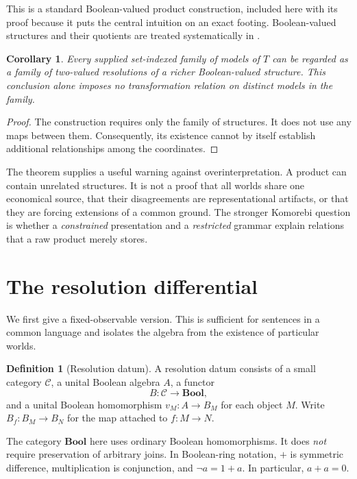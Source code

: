 \documentclass[11pt,letterpaper]{article}
\newtheorem{corollary}[theorem]{Corollary}
\theoremstyle{definition}
\newtheorem{definition}[theorem]{Definition}
\newcommand{\Bool}{\mathbf{Bool}}
\begin{document}
This is a standard Boolean-valued product construction, included here with its proof because it puts the central intuition on an exact footing. Boolean-valued structures and their quotients are treated systematically in \cite{hamkinsseabold}.

\begin{corollary}\label{cor:resolution-not-explanation}
Every supplied set-indexed family of models of $T$ can be regarded as a family of two-valued resolutions of a richer Boolean-valued structure. This conclusion alone imposes no transformation relation on distinct models in the family.
\end{corollary}
\begin{proof}
The construction requires only the family of structures. It does not use any maps between them. Consequently, its existence cannot by itself establish additional relationships among the coordinates.
\end{proof}

The theorem supplies a useful warning against overinterpretation. A product can contain unrelated structures. It is not a proof that all worlds share one economical source, that their disagreements are representational artifacts, or that they are forcing extensions of a common ground. The stronger Komorebi question is whether a \emph{constrained} presentation and a \emph{restricted} grammar explain relations that a raw product merely stores.

\section{The resolution differential}\label{sec:differential}
We first give a fixed-observable version. This is sufficient for sentences in a common language and isolates the algebra from the existence of particular worlds.

\begin{definition}[Resolution datum]\label{def:datum}
A resolution datum consists of a small category $\mathcal C$, a unital Boolean algebra $A$, a functor
\[
B:\mathcal C\longrightarrow\Bool,
\]
and a unital Boolean homomorphism $v_M:A\to B_M$ for each object $M$. Write $B_f:B_M\to B_N$ for the map attached to $f:M\to N$.
\end{definition}
The category $\Bool$ here uses ordinary Boolean homomorphisms. It does \emph{not} require preservation of arbitrary joins. In Boolean-ring notation, $+$ is symmetric difference, multiplication is conjunction, and $\neg a=1+a$. In particular, $a+a=0$.
\end{document}

